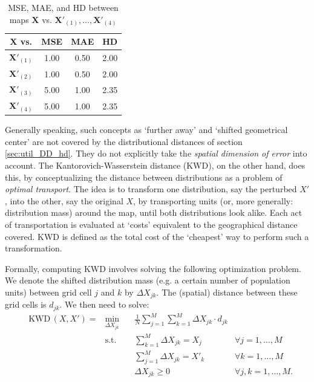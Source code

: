 \begin{tcolorbox}[breakable]
\begin{table}[H]
    \centering
    \begin{tabular}{c | c c c |}
    $\mathbf{X}$ vs. & MSE & MAE & HD \\
    \hline
    $\mathbf{X}'_{(1)}$ & 1.00 & 0.50 & 2.00 \\
    $\mathbf{X}'_{(2)}$ & 1.00 & 0.50 & 2.00 \\
    \hline
    $\mathbf{X}'_{(3)}$ & 5.00 & 1.00 & 2.35 \\
    $\mathbf{X}'_{(4)}$ & 5.00 & 1.00 & 2.35 \\
        \hline
    \end{tabular}
    \caption{MSE, MAE, and HD between maps $\mathbf{X}$ vs. $\mathbf{X}'_{(1)}, \dots, \mathbf{X}'_{(4)}$}
    \label{tab:util_nokwd}
\end{table}
\end{tcolorbox}

Generally speaking, such concepts as `further away' and `shifted geometrical center' are not covered by the distributional distances of section \ref{sec:util_DD_hd}. They do not explicitly take the \emph{spatial dimension of error} into account. The Kantorovich-Wasserstein distance (KWD), on the other hand, does this, by conceptualizing the distance between distributions as a problem of \emph{optimal transport}.
The idea is to transform one distribution, say the perturbed $X'$, into the other, say the original $X$, by transporting units (or, more generally: distribution mass) around the map, until both distributions look alike. Each act of transportation is evaluated at `costs' equivalent to the geographical distance covered. KWD is defined as the total cost of the `cheapest' way to perform such a transformation.

Formally, computing KWD involves solving the following optimization problem. We denote the shifted distribution mass (e.g. a certain number of population units) between grid cell $j$ and $k$ by $\Delta X_{jk}$. The (spatial) distance between these grid cells is $d_{jk}$. We then need to solve:
\begin{equation} \label{eq:util_kwd}
\begin{aligned}
    & \mathrm{KWD}\,(X, X') = & \underset{\Delta X_{jk}}{\text{min}} \quad & \frac{1}{N} \sum_{j=1}^M \sum_{k=1}^M \Delta X_{jk} \cdot d_{jk} & \\
    & & \text{s.t.} \quad & \sum_{k=1}^M \Delta X_{jk} = X_j & \forall j = 1, \dots, M\\
    & & & \sum_{j=1}^M \Delta X_{jk} = X'_k & \forall k = 1, \dots, M \\
    & & & \Delta X_{jk} \geq 0 & \forall j,k = 1, \dots, M.
\end{aligned}
\end{equation}

